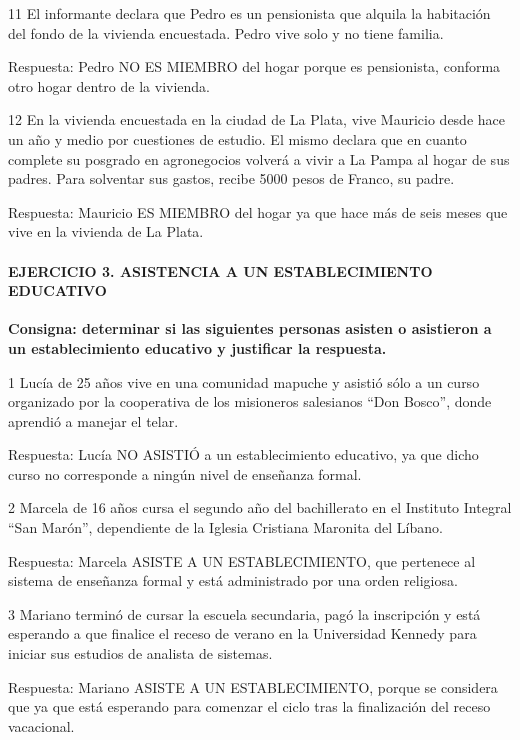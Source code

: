 \documentclass[
  openany]{book}
\begin{document}
11 El informante declara que Pedro es un pensionista que alquila la habitación del fondo de la vivienda encuestada. Pedro vive solo y no tiene familia.

Respuesta: Pedro NO ES MIEMBRO del hogar porque es pensionista, conforma otro hogar dentro de la vivienda.

12 En la vivienda encuestada en la ciudad de La Plata, vive Mauricio desde hace un año y medio por cuestiones de estudio. El mismo declara que en cuanto complete su posgrado en agronegocios volverá a vivir a La Pampa al hogar de sus padres. Para solventar sus gastos, recibe 5000 pesos de Franco, su padre.

Respuesta: Mauricio ES MIEMBRO del hogar ya que hace más de seis meses que vive en la vivienda de La Plata.

\hypertarget{ejercicio-3.-asistencia-a-un-establecimiento-educativo-1}{%
\paragraph{\texorpdfstring{\textbf{EJERCICIO 3. ASISTENCIA A UN ESTABLECIMIENTO EDUCATIVO}}{EJERCICIO 3. ASISTENCIA A UN ESTABLECIMIENTO EDUCATIVO}}\label{ejercicio-3.-asistencia-a-un-establecimiento-educativo-1}}

\textbf{Consigna: determinar si las siguientes personas asisten o asistieron a un establecimiento educativo y justificar la respuesta.}

1 Lucía de 25 años vive en una comunidad mapuche y asistió sólo a un curso organizado por la cooperativa de los misioneros salesianos ``Don Bosco'', donde aprendió a manejar el telar.

Respuesta: Lucía NO ASISTIÓ a un establecimiento educativo, ya que dicho curso no corresponde a ningún nivel de enseñanza formal.

2 Marcela de 16 años cursa el segundo año del bachillerato en el Instituto Integral ``San Marón'', dependiente de la Iglesia Cristiana Maronita del Líbano.

Respuesta: Marcela ASISTE A UN ESTABLECIMIENTO, que pertenece al sistema de enseñanza formal y está administrado por una orden religiosa.

3 Mariano terminó de cursar la escuela secundaria, pagó la inscripción y está esperando a que finalice el receso de verano en la Universidad Kennedy para iniciar sus estudios de analista de sistemas.

Respuesta: Mariano ASISTE A UN ESTABLECIMIENTO, porque se considera que ya que está esperando para comenzar el ciclo tras la finalización del receso vacacional.
\end{document}
